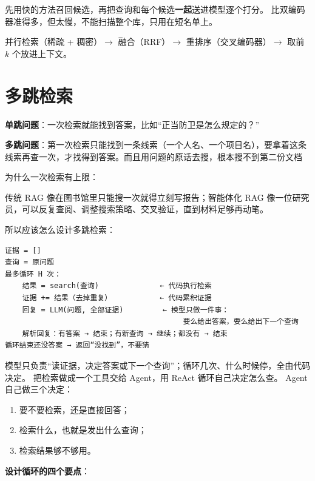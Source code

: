 先用快的方法召回候选，再把查询和每个候选\textbf{一起}送进模型逐个打分。
比双编码器准得多，但太慢，不能扫描整个库，只用在短名单上。

并行检索（稀疏 + 稠密）$\rightarrow$ 融合（RRF）$\rightarrow$ 重排序（交叉编码器）$\rightarrow$ 取前 $k$ 个放进上下文。

\section{多跳检索}
\textbf{单跳问题}：一次检索就能找到答案，比如“正当防卫是怎么规定的？”

\textbf{多跳问题}：第一次检索只能找到一条线索（一个人名、一个项目名），要拿着这条线索再查一次，才找得到答案。而且用问题的原话去搜，根本搜不到第二份文档

为什么一次检索有上限：
\begin{tcolorbox}[enhanced, sharp corners, boxrule=0pt, frame hidden,
                  borderline west={3pt}{0pt}{structurecolor},
                  colback=structurecolor!5]
传统 RAG 像在图书馆里只能搜一次就得立刻写报告；智能体化 RAG 像一位研究员，可以反复查阅、调整搜索策略、交叉验证，直到材料足够再动笔。
\end{tcolorbox}
所以应该怎么设计多跳检索：

\begin{lstlisting}[style=agenttext]
证据 = []
查询 = 原问题
最多循环 H 次：
    结果 = search(查询)              ← 代码执行检索
    证据 += 结果（去掉重复）           ← 代码累积证据
    回复 = LLM(问题, 全部证据)         ← 模型只做一件事：
                                         要么给出答案，要么给出下一个查询
    解析回复：有答案 → 结束；有新查询 → 继续；都没有 → 结束
循环结束还没答案 → 返回“没找到”，不要猜
\end{lstlisting}
模型只负责“读证据，决定答案或下一个查询”；循环几次、什么时候停，全由代码决定。
把检索做成一个工具交给 Agent，用 ReAct 循环自己决定怎么查。
Agent自己做三个决定：
\begin{enumerate}
  \item 要不要检索，还是直接回答；
  \item 检索什么，也就是发出什么查询；
  \item 检索结果够不够用。
\end{enumerate}

\textbf{设计循环的四个要点}：

